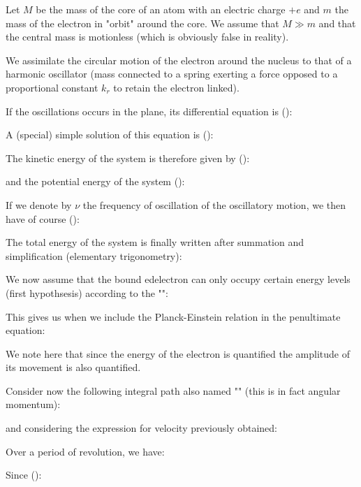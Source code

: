Let $M$ be the mass of the core of an atom with an electric charge $+e$ and $m$ the mass of the electron in "orbit" around the core. We assume that $M \gg m$ and that the central mass is motionless (which is obviously false in reality).

We assimilate the circular motion of the electron around the nucleus to that of a harmonic oscillator (mass connected to a spring exerting a force opposed to a proportional constant $k_r$ to retain the  electron linked).

If the oscillations occurs in the plane, its differential equation is ():
	
A (special) simple solution of this equation is ():
	
The kinetic energy of the system is therefore given  by ():
	
and the potential energy of the system ():
	
If we denote by $\nu$ the frequency of oscillation of the oscillatory motion, we then have of course ():
	
The total energy of the system is finally written after summation and simplification (elementary trigonometry):
	
We now assume that the bound edelectron can only occupy certain energy levels (first hypothsesis) according to the "\label{planck einstein relation}":
	
This gives us when we include the Planck-Einstein relation in the penultimate equation:
	
We note here that since the energy of the electron is quantified the amplitude of its movement is also quantified.

Consider now the following integral path also named "" (this is in fact angular momentum):
	
and considering the expression  for velocity previously obtained:
	
Over a period of revolution, we have:
	
Since ():
	
